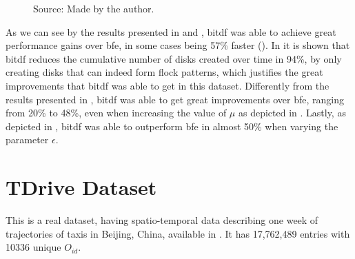 {\begin{figure}[h!]
\begin{subfigure}[t]{0.48\textwidth}
        \label{fig:berlinmod_disks}
    \end{subfigure}
    \footnotesize{Source: Made by the author.}
    \label{fig:berlinmod_results2}
\end{figure}

As we can see by the results presented in  and , \ac{bitdf}
was able to achieve great performance gains over \ac{bfe}, in some cases being 57\% faster
(). In  it is shown that \ac{bitdf} reduces the cumulative
number of disks created over time in 94\%, by only creating disks that can indeed form flock patterns, which justifies
the great improvements that \ac{bitdf} was able to get in this dataset. Differently from the results presented in
, \ac{bitdf} was able to get great improvements over \ac{bfe}, ranging from 20\% to 48\%, even when
increasing the value of $\mu$ as depicted in . Lastly, as depicted in
, \ac{bitdf} was able to outperform \ac{bfe} in almost 50\% when varying the parameter
$\epsilon$.

\section{TDrive Dataset}
\label{sec:tdrive}
This is a real dataset, having spatio-temporal data describing one week of trajectories of taxis in Beijing, China,
available in \citep{tdrive}. It has 17,762,489 entries with 10336 unique $O_{id}$.

}
